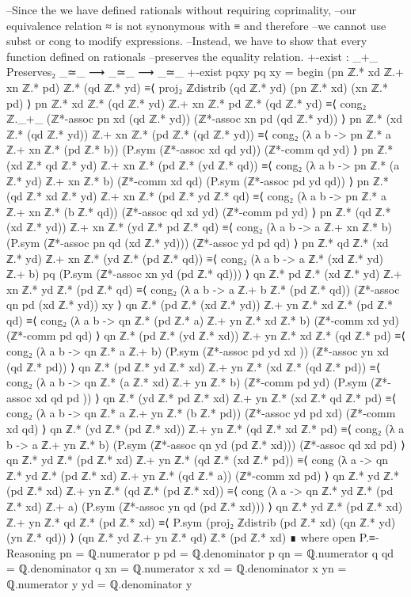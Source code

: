 \documentclass[11pt,a4paper]{article}
\begin{document}
\begin{code}
--Since the we have defined rationals without requiring coprimality, 
--our equivalence relation ≈ is not synonymous with ≡ and therefore 
--we cannot use subst or cong to modify expressions. 
--Instead, we have to show that every function defined on rationals 
--preserves the equality relation.
+-exist :  _+_ Preserves₂ _≃_ ⟶ _≃_ ⟶ _≃_
+-exist {p}{q}{x}{y} pq xy =  begin 
  (pn ℤ.* xd ℤ.+ xn ℤ.* pd) ℤ.* (qd ℤ.* yd) 
  ≡⟨ proj₂ ℤdistrib (qd ℤ.* yd) (pn ℤ.* xd) (xn ℤ.* pd)   ⟩
  pn ℤ.* xd ℤ.* (qd ℤ.* yd) ℤ.+ xn ℤ.* pd ℤ.* (qd ℤ.* yd) 
  ≡⟨ cong₂ ℤ._+_ (ℤ*-assoc pn xd (qd ℤ.* yd)) (ℤ*-assoc xn pd (qd ℤ.* yd)) ⟩
  pn ℤ.* (xd ℤ.* (qd ℤ.* yd)) ℤ.+ xn ℤ.* (pd ℤ.* (qd ℤ.* yd)) 
  ≡⟨ cong₂ (λ a b -> pn ℤ.* a ℤ.+ xn ℤ.* (pd ℤ.* b)) 
    (P.sym (ℤ*-assoc xd qd yd)) (ℤ*-comm qd yd) ⟩
  pn ℤ.* (xd ℤ.* qd ℤ.* yd) ℤ.+ xn ℤ.* (pd ℤ.* (yd ℤ.* qd)) 
  ≡⟨ cong₂ (λ a b -> pn ℤ.* (a ℤ.* yd) ℤ.+ xn ℤ.* b) 
    (ℤ*-comm xd qd) (P.sym (ℤ*-assoc pd yd qd)) ⟩
  pn ℤ.* (qd ℤ.* xd ℤ.* yd) ℤ.+ xn ℤ.* (pd ℤ.* yd ℤ.* qd) 
  ≡⟨ cong₂ (λ a b -> pn ℤ.* a ℤ.+ xn ℤ.* (b ℤ.* qd)) 
    (ℤ*-assoc qd xd yd) (ℤ*-comm pd yd) ⟩
  pn ℤ.* (qd ℤ.* (xd ℤ.* yd)) ℤ.+ xn ℤ.* (yd ℤ.* pd ℤ.* qd) 
  ≡⟨ cong₂ (λ a b -> a ℤ.+ xn ℤ.* b) 
    (P.sym (ℤ*-assoc pn qd (xd ℤ.* yd))) (ℤ*-assoc yd pd qd) ⟩
  pn ℤ.* qd ℤ.* (xd ℤ.* yd) ℤ.+ xn ℤ.* (yd ℤ.* (pd ℤ.* qd)) 
  ≡⟨ cong₂ (λ a b -> a ℤ.* (xd ℤ.* yd) ℤ.+ b) pq  
    (P.sym (ℤ*-assoc xn yd (pd ℤ.* qd))) ⟩
  qn ℤ.* pd ℤ.* (xd ℤ.* yd) ℤ.+ xn ℤ.* yd ℤ.* (pd ℤ.* qd) 
  ≡⟨ cong₂ (λ a b -> a ℤ.+ b ℤ.* (pd ℤ.* qd)) 
    (ℤ*-assoc qn pd (xd ℤ.* yd)) xy ⟩
  qn ℤ.* (pd ℤ.* (xd ℤ.* yd)) ℤ.+ yn ℤ.* xd ℤ.* (pd ℤ.* qd) 
  ≡⟨ cong₂ (λ a b -> qn ℤ.* (pd ℤ.* a) ℤ.+ yn ℤ.* xd ℤ.* b) 
    (ℤ*-comm xd yd) (ℤ*-comm pd qd) ⟩
  qn ℤ.* (pd ℤ.* (yd ℤ.* xd)) ℤ.+ yn ℤ.* xd ℤ.* (qd ℤ.* pd) 
  ≡⟨ cong₂ (λ a b -> qn ℤ.* a ℤ.+ b) 
    (P.sym (ℤ*-assoc pd yd xd )) (ℤ*-assoc yn xd (qd ℤ.* pd)) ⟩
  qn ℤ.* (pd ℤ.* yd ℤ.* xd) ℤ.+ yn ℤ.* (xd ℤ.* (qd ℤ.* pd)) 
  ≡⟨ cong₂ (λ a b -> qn ℤ.* (a ℤ.* xd) ℤ.+ yn ℤ.* b) 
    (ℤ*-comm pd yd) (P.sym (ℤ*-assoc xd qd pd )) ⟩
  qn ℤ.* (yd ℤ.* pd ℤ.* xd) ℤ.+ yn ℤ.* (xd ℤ.* qd ℤ.* pd) 
  ≡⟨ cong₂ (λ a b -> qn ℤ.* a ℤ.+ yn ℤ.* (b ℤ.* pd)) 
    (ℤ*-assoc yd pd xd) (ℤ*-comm xd qd) ⟩
  qn ℤ.* (yd ℤ.* (pd ℤ.* xd)) ℤ.+ yn ℤ.* (qd ℤ.* xd ℤ.* pd) 
  ≡⟨ cong₂ (λ a b -> a ℤ.+ yn ℤ.* b) 
    (P.sym (ℤ*-assoc qn yd (pd ℤ.* xd))) (ℤ*-assoc qd xd pd) ⟩
  qn ℤ.* yd ℤ.* (pd ℤ.* xd) ℤ.+ yn ℤ.* (qd ℤ.* (xd ℤ.* pd)) 
  ≡⟨ cong (λ a -> qn ℤ.* yd ℤ.* (pd ℤ.* xd) ℤ.+ yn ℤ.* (qd ℤ.* a)) 
    (ℤ*-comm xd pd) ⟩
  qn ℤ.* yd ℤ.* (pd ℤ.* xd) ℤ.+ yn ℤ.* (qd ℤ.* (pd ℤ.* xd)) 
  ≡⟨ cong (λ a -> qn ℤ.* yd ℤ.* (pd ℤ.* xd) ℤ.+ a) 
    (P.sym (ℤ*-assoc yn qd (pd ℤ.* xd))) ⟩
  qn ℤ.* yd ℤ.* (pd ℤ.* xd) ℤ.+ yn ℤ.* qd ℤ.* (pd ℤ.* xd) 
  ≡⟨ P.sym (proj₂ ℤdistrib (pd ℤ.* xd) (qn ℤ.* yd) (yn ℤ.* qd)) ⟩
  (qn ℤ.* yd ℤ.+ yn ℤ.* qd) ℤ.* (pd ℤ.* xd)
        ∎
         where
           open P.≡-Reasoning
           pn = ℚ.numerator p
           pd = ℚ.denominator p
           qn = ℚ.numerator q
           qd = ℚ.denominator q
           xn = ℚ.numerator x
           xd = ℚ.denominator x
           yn = ℚ.numerator y
           yd = ℚ.denominator y


\end{code}
\end{document}

